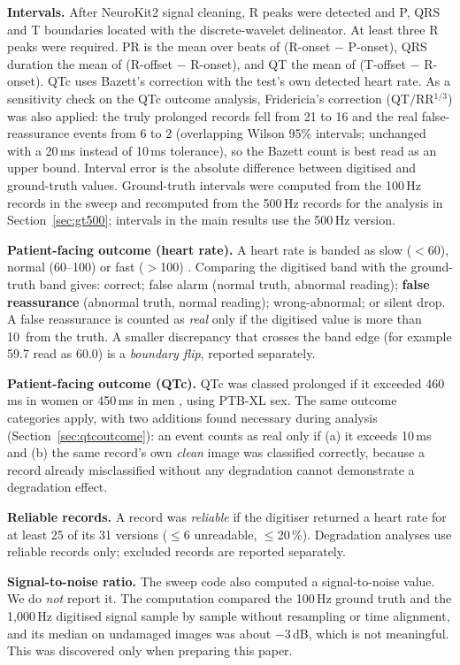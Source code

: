 \textbf{Intervals.} After NeuroKit2 signal cleaning, R peaks were detected and P, QRS and T boundaries located with the discrete-wavelet delineator. At least three R peaks were required. PR is the mean over beats of (R-onset $-$ P-onset), QRS duration the mean of (R-offset $-$ R-onset), and QT the mean of (T-offset $-$ R-onset). QTc uses Bazett's correction with the test's own detected heart rate. As a sensitivity check on the QTc outcome analysis, Fridericia's correction (QT$/$RR$^{1/3}$) was also applied: the truly prolonged records fell from 21 to 16 and the real false-reassurance events from 6 to 2 (overlapping Wilson 95\% intervals; unchanged with a 20\,ms instead of 10\,ms tolerance), so the Bazett count is best read as an upper bound. Interval error is the absolute difference between digitised and ground-truth values. Ground-truth intervals were computed from the 100\,Hz records in the sweep and recomputed from the 500\,Hz records for the analysis in Section~\ref{sec:gt500}; intervals in the main results use the 500\,Hz version.

\textbf{Patient-facing outcome (heart rate).} A heart rate is banded as slow ($<$60\bpm), normal (60--100\bpm) or fast ($>$100\bpm) \citep{ref52}. Comparing the digitised band with the ground-truth band gives: correct; false alarm (normal truth, abnormal reading); \textbf{false reassurance} (abnormal truth, normal reading); wrong-abnormal; or silent drop. A false reassurance is counted as \emph{real} only if the digitised value is more than 10\bpm\ from the truth. A smaller discrepancy that crosses the band edge (for example 59.7 read as 60.0\bpm) is a \emph{boundary flip}, reported separately.

\textbf{Patient-facing outcome (QTc).} QTc was classed prolonged if it exceeded 460\,ms in women or 450\,ms in men \citep{ref52}, using PTB-XL sex. The same outcome categories apply, with two additions found necessary during analysis (Section~\ref{sec:qtcoutcome}): an event counts as real only if (a) it exceeds 10\,ms and (b) the same record's own \emph{clean} image was classified correctly, because a record already misclassified without any degradation cannot demonstrate a degradation effect.

\textbf{Reliable records.} A record was \emph{reliable} if the digitiser returned a heart rate for at least 25 of its 31 versions ($\le$6 unreadable, $\le$20\,\%). Degradation analyses use reliable records only; excluded records are reported separately.

\textbf{Signal-to-noise ratio.} The sweep code also computed a signal-to-noise value. We do \emph{not} report it. The computation compared the 100\,Hz ground truth and the 1{,}000\,Hz digitised signal sample by sample without resampling or time alignment, and its median on undamaged images was about $-3$\,dB, which is not meaningful. This was discovered only when preparing this paper.

